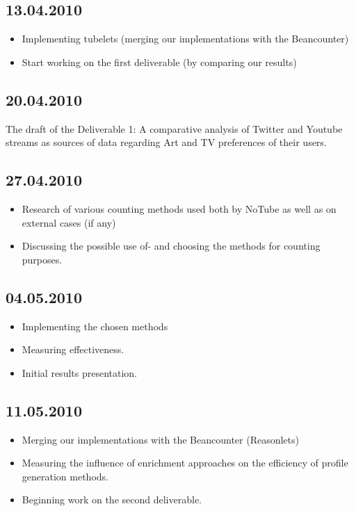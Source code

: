 \documentclass{article}
\begin{document}
\subsection{13.04.2010}
\begin{itemize}
\item{Implementing tubelets (merging our implementations with the Beancounter)}
\item{Start working on the first deliverable (by comparing our results)}
\end{itemize}

\subsection{20.04.2010}
The draft of the Deliverable 1:
A comparative analysis of Twitter and Youtube streams as sources of data
regarding Art and TV preferences of their users.


\subsection{27.04.2010}
\begin{itemize}
\item{Research of various counting methods used both by NoTube as well as on
external cases (if any)}
\item{Discussing the possible use of- and choosing the methods for counting
purposes.}
\end{itemize}

\subsection{04.05.2010}
\begin{itemize}
\item{Implementing the chosen methods}
\item{Measuring effectiveness.}
\item{Initial results presentation.}
\end{itemize}

\subsection{11.05.2010}
\begin{itemize}
\item{Merging our implementations with the Beancounter (Reasonlets)}
\item{Measuring the influence of enrichment approaches on the efficiency of profile
generation methods.}
\item{Beginning work on the second deliverable.}
\end{itemize}
\end{document}
